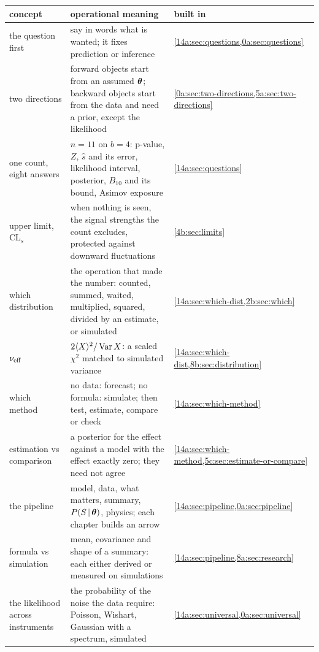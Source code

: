 \begin{center}
\small
\renewcommand{\arraystretch}{1.15}
\begin{tabularx}{\linewidth}{@{}>{\raggedright\arraybackslash}p{3.3cm}
                               >{\raggedright\arraybackslash}X
                               >{\raggedright\arraybackslash}p{2.3cm}@{}}
\toprule
concept & operational meaning & built in\\\midrule
the question first & say in words what is wanted; it fixes prediction or inference & \cref{14a:sec:questions,0a:sec:questions}\\
two directions & forward objects start from an assumed $\bm{\theta}$; backward objects start from the data and need a prior, except the likelihood & \cref{0a:sec:two-directions,5a:sec:two-directions}\\
one count, eight answers & $n=11$ on $b=4$: p-value, $Z$, $\hat s$ and its error, likelihood interval, posterior, $B_{10}$ and its bound, Asimov exposure & \cref{14a:sec:questions}\\
upper limit, $\mathrm{CL}_s$ & when nothing is seen, the signal strengths the count excludes, protected against downward fluctuations & \cref{4b:sec:limits}\\
which distribution & the operation that made the number: counted, summed, waited, multiplied, squared, divided by an estimate, or simulated & \cref{14a:sec:which-dist,2b:sec:which}\\
$\nu_{\rm eff}$ & $2\langle X\rangle^2/\operatorname{Var} X$: a scaled $\chi^2$ matched to simulated variance & \cref{14a:sec:which-dist,8b:sec:distribution}\\
which method & no data: forecast; no formula: simulate; then test, estimate, compare or check & \cref{14a:sec:which-method}\\
estimation vs comparison & a posterior for the effect against a model with the effect exactly zero; they need not agree & \cref{14a:sec:which-method,5c:sec:estimate-or-compare}\\
the pipeline & model, data, what matters, summary, $P(S\,\vert\,\bm{\theta})$, physics; each chapter builds an arrow & \cref{14a:sec:pipeline,0a:sec:pipeline}\\
formula vs simulation & mean, covariance and shape of a summary: each either derived or measured on simulations & \cref{14a:sec:pipeline,8a:sec:research}\\
the likelihood across instruments & the probability of the noise the data require: Poisson, Wishart, Gaussian with a spectrum, simulated & \cref{14a:sec:universal,0a:sec:universal}\\

\end{tabularx}
\end{center}
